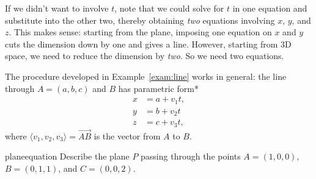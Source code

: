 \documentclass{watsonbook}
\begin{document}
If we didn't want to involve $t$, note that we could solve for $t$ in
one equation and substitute into the other two, thereby obtaining
\textit{two} equations involving $x$, $y$, and $z$. This makes sense:
starting from the plane, imposing one equation on $x$ and $y$ cuts the
dimension down by one and gives a line. However, starting from 3D
space, we need to reduce the dimension by \textit{two}. So we need
two equations.

The procedure developed in Example~\ref{exam:line} works in general:
the line through $A = (a,b,c)$ and $B$ has parametric form*
\begin{align*}
  x &= a + v_1 t, \\
  y &= b + v_2 t \\ 
  z &= c + v_3 t, 
\end{align*}
where $\langle v_1, v_2, v_3 \rangle = \overrightarrow{AB}$ is the
vector from $A$ to $B$.

\begin{example}{}{planeequation}
  Describe the plane $P$ passing through the points $A = (1,0,0)$, $B =
  (0,1,1)$, and $C = (0,0,2)$.
\end{example}
\end{document}
